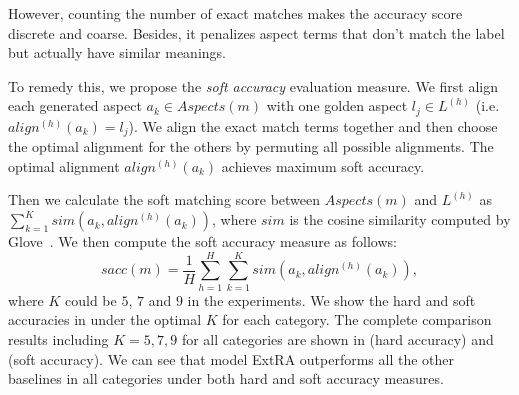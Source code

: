 However, counting the number of exact matches 
makes the accuracy score discrete and coarse. 
Besides, it penalizes aspect terms that don't match the label
but actually have similar meanings.


To remedy this, we propose the \emph{soft accuracy}  evaluation measure.
We first align each generated aspect $a_k \in Aspects(m)$
with one golden aspect $l_j \in L^{(h)}$ (i.e. $align^{(h)}(a_k)=l_j$). 
We align the exact match terms together and then choose the optimal alignment for the others by permuting all possible alignments. 
The optimal alignment $align^{(h)}(a_k)$ achieves
maximum soft accuracy.

Then we calculate the soft matching score between
$Aspects(m)$ and $L^{(h)}$ as 
$\sum_{k=1}^{K}sim(a_k, align^{(h)}(a_k))$,
where $sim$ is the cosine similarity computed by 
Glove~\cite{pennington2014glove}. 
We then compute the soft accuracy measure as follows:
\begin{equation}
sacc(m) =\frac{1}{H}\sum_{h=1}^{H}\sum_{k=1}^{K}sim(a_k, align^{(h)}(a_k)), 
\end{equation}
where $K$ could be $5$, $7$ and $9$
in the experiments.
We show the hard and soft accuracies
in  under the optimal $K$ for each category. 
The complete comparison results including $K=5,7,9$ for all categories are shown
in  (hard accuracy) and  (soft accuracy).
We can see that model ExtRA outperforms all the other baselines 
in all categories under both hard and soft accuracy measures.


